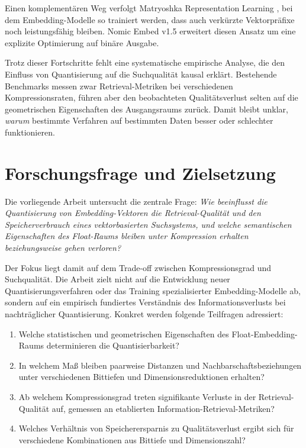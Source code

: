 Einen komplementären Weg verfolgt Matryoshka Representation Learning \cite{kusupati_2022_matryoshka}, bei dem Embedding-Modelle so trainiert werden, dass auch verkürzte Vektorpräfixe noch leistungsfähig bleiben.
Nomic Embed v1.5 \cite{nussbaum_2024_nomic} erweitert diesen Ansatz um eine explizite Optimierung auf binäre Ausgabe.
\par
Trotz dieser Fortschritte fehlt eine systematische empirische Analyse, die den Einfluss von Quantisierung auf die Suchqualität kausal erklärt.
Bestehende Benchmarks messen zwar Retrieval-Metriken bei verschiedenen Kompressionsraten, führen aber den beobachteten Qualitätsverlust selten auf die geometrischen Eigenschaften des Ausgangsraums zurück.
Damit bleibt unklar, \emph{warum} bestimmte Verfahren auf bestimmten Daten besser oder schlechter funktionieren.
%
\section{Forschungsfrage und Zielsetzung}
\label{sec:forschungsfrage}
%
Die vorliegende Arbeit untersucht die zentrale Frage:
\emph{Wie beeinflusst die Quantisierung von Embedding-Vektoren die Retrieval-Qualität und den Speicherverbrauch eines vektorbasierten Suchsystems, und welche semantischen Eigenschaften des Float-Raums bleiben unter Kompression erhalten beziehungsweise gehen verloren?}
\par
Der Fokus liegt damit auf dem Trade-off zwischen Kompressionsgrad und Suchqualität.
Die Arbeit zielt nicht auf die Entwicklung neuer Quantisierungsverfahren oder das Training spezialisierter Embedding-Modelle ab, sondern auf ein empirisch fundiertes Verständnis des Informationsverlusts bei nachträglicher Quantisierung.
Konkret werden folgende Teilfragen adressiert:
\begin{enumerate}
  \item Welche statistischen und geometrischen Eigenschaften des Float-Embedding-Raums determinieren die Quantisierbarkeit?
  \item In welchem Maß bleiben paarweise Distanzen und Nachbarschaftsbeziehungen unter verschiedenen Bittiefen und Dimensionsreduktionen erhalten?
  \item Ab welchem Kompressionsgrad treten signifikante Verluste in der Retrieval-Qualität auf, gemessen an etablierten Information-Retrieval-Metriken?
  \item Welches Verhältnis von Speicherersparnis zu Qualitätsverlust ergibt sich für verschiedene Kombinationen aus Bittiefe und Dimensionszahl?
\end{enumerate}
%
